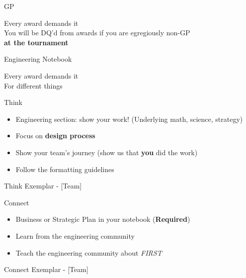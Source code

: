 \documentclass{beamer}
\begin{document}
  \begin{frame}{GP}
    \begin{center}
      \huge{Every award demands it}
      \\
      \vspace{2em}
      \small{
        You will be DQ'd from awards if you are egregiously non-GP
        \\
        \textbf{at the tournament}
      }
    \end{center}
  \end{frame}

  \begin{frame}{Engineering Notebook}
    \begin{center}
      \huge{Every award demands it}
      \\
      \vspace{2em}
      \small{For different things}
    \end{center}
  \end{frame}

  \begin{frame}{Think}
    \begin{itemize}
    \item Engineering section:
      show your work! (Underlying math, science, strategy) \pause
    \item Focus on \textbf{design process} \pause
    \item Show your team's journey
      (show us that \textbf{you} did the work) \pause
    \item Follow the formatting guidelines
    \end{itemize}
  \end{frame}

  \begin{frame}{Think Exemplar - [Team]}
  \end{frame}

  \begin{frame}{Connect}
    \begin{itemize}
    \item Business or Strategic Plan in your notebook (\textbf{Required})\pause
    \item Learn from the engineering community \pause
    \item Teach the engineering community about \textit{FIRST}
    \end{itemize}
  \end{frame}

  \begin{frame}{Connect Exemplar - [Team]}
  \end{frame}
\end{document}
